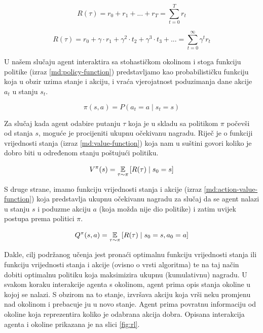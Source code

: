 \begin{equation}
    \label{md:undiscounted-return}
    R(\tau) = r_0 + r_1 + ... + r_T = \sum_{t=0}^{T}r_t
\end{equation}

\begin{equation}
    \label{md:discounted-return}
    R(\tau) = r_0 + \gamma \cdot r_1 + \gamma^2 \cdot t_2 + \gamma^3 \cdot t_3 + ... = \sum_{t=0}^{\infty}\gamma^t r_t
\end{equation}

U našem slučaju agent interaktira sa stohastičkom okolinom i stoga funkciju politike  (izraz \ref{md:policy-function}) predstavljamo kao probabilističku funkciju koja u obzir uzima stanje i akciju, i vraća vjerojatnost poduzimanja dane akcije $a_t$ u stanju $s_t$.

\begin{equation}
    \label{md:policy-function}
    \pi(s, a) = P(a_t = a \mid s_t = s)
\end{equation}

Za slučaj kada agent odabire putanju $\tau$ koja je u skladu sa politikom $\pi$ počevši od stanja $s$, moguće je procijeniti ukupnu očekivanu nagradu. Riječ je o funkciji vrijednosti stanja  (izraz \ref{md:value-function}) koja nam u suštini govori koliko je dobro biti u određenom stanju poštujući politiku.

\begin{equation}
    \label{md:value-function}
    V^{\pi}(s) = \operatorname*{\mathbb{E}}_{\tau \sim \pi} \left[ {R(\tau) \mid s_0 = s} \right]
\end{equation}

S druge strane, imamo funkciju vrijednosti stanja i akcije  (izraz \ref{md:action-value-function}) koja predstavlja ukupnu očekivanu nagradu za slučaj da se agent nalazi u stanju $s$ i poduzme akciju $a$ (koja možda nije dio politike) i zatim uvijek postupa prema politici $\pi$.

\begin{equation}
    \label{md:action-value-function}
    Q^{\pi}(s,a) = \operatorname*{\mathbb{E}}_{\tau \sim \pi} \left[ {R(\tau) \mid s_0 = s, a_0 = a} \right]
\end{equation}


Dakle, cilj podržanog učenja jest pronaći optimalnu funkciju vrijednosti stanja ili funkciju vrijednosti stanja i akcije (ovisno o vrsti algoritma) te na taj način dobiti optimalnu politiku koja maksimizira ukupnu (kumulativnu) nagradu. U svakom koraku interakcije agenta s okolinom, agent prima opis stanja okoline u kojoj se nalazi. S obzirom na to stanje, izvršava akciju koja vrši neku promjenu nad okolinom i prebacuje ju u novo stanje. Agent prima povratnu informaciju od okoline koja reprezentira koliko je odabrana akcija dobra. Opisana interakcija agenta i okoline prikazana je na slici \ref{fig:rl}.

